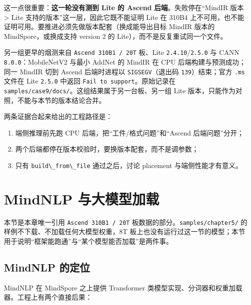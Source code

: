 这一点很重要：\textbf{这一轮没有测到 Lite 的 Ascend
后端}。失败停在``MindIR 版本 \textgreater{} Lite
支持的版本''这一层，因此它既不能证明 Lite 在 310B4
上不可用，也不能证明可用。要推进必须先做版本配套（换成能导出目标 MindIR
版本的 MindSpore，或换成支持 version 2 的
Lite），而不是反复重试同一个文件。

另一组更早的烟测来自 \passthrough{\lstinline!Ascend 310B1 / 20T!}
板、Lite
\passthrough{\lstinline!2.4.10!}/\passthrough{\lstinline!2.5.0!} 与 CANN
\passthrough{\lstinline!8.0.0!}：MobileNetV2 与最小 AddNet 的 MindIR 在
CPU 后端构建与预测成功；同一 MindIR 切到 Ascend 后端时进程以
\passthrough{\lstinline!SIGSEGV!}（退出码
\passthrough{\lstinline!139!}）结束；官方 \passthrough{\lstinline!.ms!}
文件在 Lite \passthrough{\lstinline!2.5.0!} 中返回
\passthrough{\lstinline!Fail to support!}。原始记录在
\passthrough{\lstinline!samples/case9/docs/!}。这组结果属于另一台板、另一组
Lite 版本，只能作为对照，不能与本节的版本结论合并。

两条证据合起来给出的工程路径是：

\begin{enumerate}
\def\labelenumi{\arabic{enumi}.}
\tightlist
\item
  端侧推理前先跑 CPU 后端，把``工件/格式问题''和``Ascend
  后端问题''分开；
\item
  两个后端都停在版本校验时，要换版本配套，而不是调参数；
\item
  只有 \passthrough{\lstinline!build\_from\_file!} 通过之后，讨论
  placement 与端侧性能才有意义。
\end{enumerate}

\section{MindNLP 与大模型加载}\label{src-book-chapter5-h28}

本节是本章唯一引用 \passthrough{\lstinline!Ascend 310B1 / 20T!}
板数据的部分。\passthrough{\lstinline!samples/chapter5/!}
的样例不下载、不加载任何大模型权重，8T
板上也没有运行过这一节的模型；本节用于说明``框架能跑通''与``某个模型能否加载''是两件事。

\subsection{MindNLP 的定位}\label{src-book-chapter5-h29}

MindNLP 在 MindSpore 之上提供 Transformer
类模型实现、分词器和权重加载器。工程上有两个直接后果：

